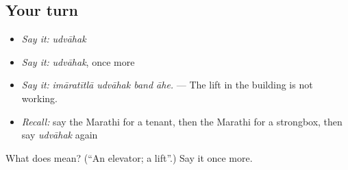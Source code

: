 \subsection*{Your turn}
\begin{itemize}
\raggedright
  \item \emph{Say it:} \emph{udvāhak}
  \item \emph{Say it:} \emph{udvāhak}, once more
  \item \emph{Say it:} \emph{imāratītlā udvāhak band āhe.} — The lift in the building is not working.
  \item \emph{Recall:} say the Marathi for a tenant, then the Marathi for a strongbox, then say \emph{udvāhak} again
\end{itemize}

\begin{tcolorbox}[breakable,colback=teal!4,colframe=teal!35!black,title={Before you move on}]
What does  mean? (\textquotedblleft{}An elevator; a lift\textquotedblright{}.) Say it once more.
\end{tcolorbox}
